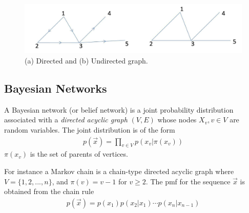 \documentclass[11pt,a4paper]{article}
\begin{document}
\begin{center}\begin{figure}[htbp]
    \centering
    \includegraphics[scale=0.25]{graph.png}
    \caption{(a) Directed and (b) Undirected graph.}
    \label{}
\end{figure}\end{center}

\subsection{Bayesian Networks}
A Bayesian network (or belief network) is a joint probability distribution associated with a \textit{directed acyclic graph} $(V,E)$ whose nodes $X_v, v \in V$ are random variables. The joint distribution is of the form
\begin{equation}
    \begin{aligned}
        p(\vec{x})=\prod_{v\in V}p(x_v|\pi(x_v))
    \end{aligned}
    \nonumber
\end{equation}
$\pi(x_v)$ is the set of parents of vertices.

For instance a Markov chain is a chain-type directed acyclic graph where $V = \{1, 2,..., n\}$, and $\pi(v) = v - 1$ for $v \geq 2$. The pmf for the sequence $\vec{x}$ is obtained from the chain rule
\begin{equation}
    \begin{aligned}
        p(\vec{x})=p(x_1)p(x_2|x_1)\cdots p(x_n|x_{n-1})
    \end{aligned}
    \nonumber
\end{equation}
\end{document}
